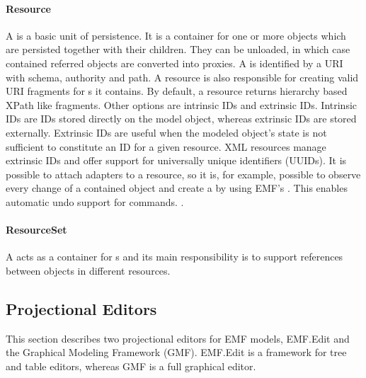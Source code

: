 \paragraph{Resource}
A  is a basic unit of persistence. It is a container for one or more objects which are persisted together with their children. They can be unloaded, in which case contained referred objects are converted into proxies. A  is identified by a URI with schema, authority and path. A resource is also responsible for creating valid URI fragments for s it contains. By default, a resource returns hierarchy based XPath like fragments. Other options are intrinsic IDs and extrinsic IDs. Intrinsic IDs are IDs stored directly on the model object, whereas extrinsic IDs are stored externally. Extrinsic IDs are useful when the modeled object's state is not sufficient to constitute an ID for a given resource. XML resources manage extrinsic IDs and offer support for universally unique identifiers (UUIDs). It is possible to attach adapters to a resource, so it is, for example, possible to observe every change of a contained object and create a  by using EMF's . This enables automatic undo support for commands. \cite{EMF2nd}.

\paragraph{ResourceSet}
A  acts as a container for s and its main responsibility is to support references between objects in different resources. 

\subsection{Projectional Editors}
This section describes two projectional editors for EMF models, EMF.Edit and the Graphical Modeling Framework (GMF). EMF.Edit is a framework for tree and table editors, whereas GMF is a full graphical editor.


